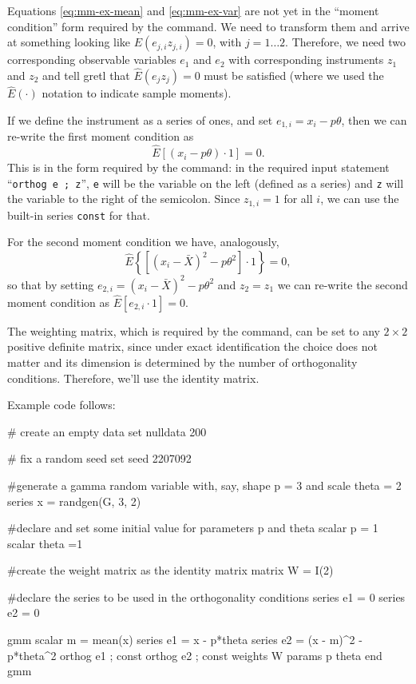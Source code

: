 \bigskip

Equations \ref{eq:mm-ex-mean} and \ref{eq:mm-ex-var} are not yet in
the ``moment condition'' form required by the  command. We
need to transform them and arrive at something looking like $E(e_{j,i}
z_{j,i}) = 0$, with $j=1 \ldots 2$. Therefore, we need two
corresponding observable variables $e_1$ and $e_2$ with corresponding
instruments $z_1$ and $z_2$ and tell gretl that $\hat{E}(e_j
z_j) = 0$ must be satisfied (where we used the $\hat{E}(\cdot)$
notation to indicate sample moments).

If we define the instrument as a series of ones, and set $e_{1,i} =
x_i - p\theta$, then we can re-write the first moment condition as
\[
\hat{E}[(x_i - p\theta) \cdot 1] = 0.
\]
This is in the form required by the  command: in the
required input statement ``\verb|orthog e ; z|'', \texttt{e} will be
the variable on the left (defined as a series) and \texttt{z} will the
variable to the right of the semicolon. Since $z_{1,i} = 1$ for all
$i$, we can use the built-in series \texttt{const} for that.

For the second moment condition we have, analogously,
\[
\hat{E}\left\{\left[(x_i - \bar{X})^2 - p\theta^2\right] \cdot 1\right\} = 0,
\]
so that by setting $e_{2,i} = (x_i - \bar{X})^2 - p\theta^2$ and $z_2
= z_1$ we can re-write the second moment condition as $\hat{E}[e_{2,i}
\cdot 1] = 0$.

The weighting matrix, which is required by the  command, can
be set to any $2 \times 2$ positive definite matrix, since under exact
identification the choice does not matter and its dimension is
determined by the number of orthogonality conditions. Therefore, we'll
use the identity matrix.

Example code follows:
\begin{scode}
# create an empty data set 
nulldata 200

# fix a random seed
set seed 2207092

#generate a gamma random variable with, say, shape p = 3 and scale theta = 2
series x = randgen(G, 3, 2)  

#declare and set some initial value for parameters p and theta
scalar p = 1				
scalar theta =1
								
#create the weight matrix as the identity matrix
matrix W = I(2)

#declare the series to be used in the orthogonality conditions
series e1 = 0				
series e2 = 0				

gmm
    scalar m = mean(x)
    series e1 = x - p*theta
    series e2 = (x - m)^2 - p*theta^2
    orthog e1 ; const
    orthog e2 ; const
    weights W
    params p theta
end gmm
\end{scode}

